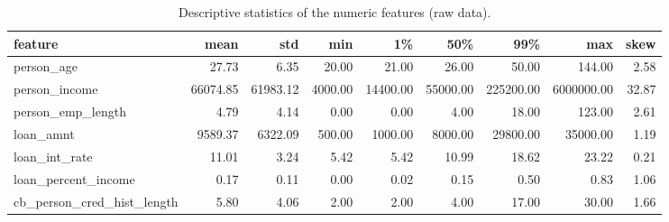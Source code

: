 \begin{table}[H]
\centering
\scriptsize
\begin{adjustbox}{max width=\linewidth}
\begin{tabular}{lrrrrrrrr}
\toprule
feature & mean & std & min & 1\% & 50\% & 99\% & max & skew \\
\midrule
person\_age & 27.73 & 6.35 & 20.00 & 21.00 & 26.00 & 50.00 & 144.00 & 2.58 \\
person\_income & 66074.85 & 61983.12 & 4000.00 & 14400.00 & 55000.00 & 225200.00 & 6000000.00 & 32.87 \\
person\_emp\_length & 4.79 & 4.14 & 0.00 & 0.00 & 4.00 & 18.00 & 123.00 & 2.61 \\
loan\_amnt & 9589.37 & 6322.09 & 500.00 & 1000.00 & 8000.00 & 29800.00 & 35000.00 & 1.19 \\
loan\_int\_rate & 11.01 & 3.24 & 5.42 & 5.42 & 10.99 & 18.62 & 23.22 & 0.21 \\
loan\_percent\_income & 0.17 & 0.11 & 0.00 & 0.02 & 0.15 & 0.50 & 0.83 & 1.06 \\
cb\_person\_cred\_hist\_length & 5.80 & 4.06 & 2.00 & 2.00 & 4.00 & 17.00 & 30.00 & 1.66 \\
\bottomrule
\end{tabular}
\end{adjustbox}
\caption{Descriptive statistics of the numeric features (raw data).}
\label{tab:numeric}
\end{table}

